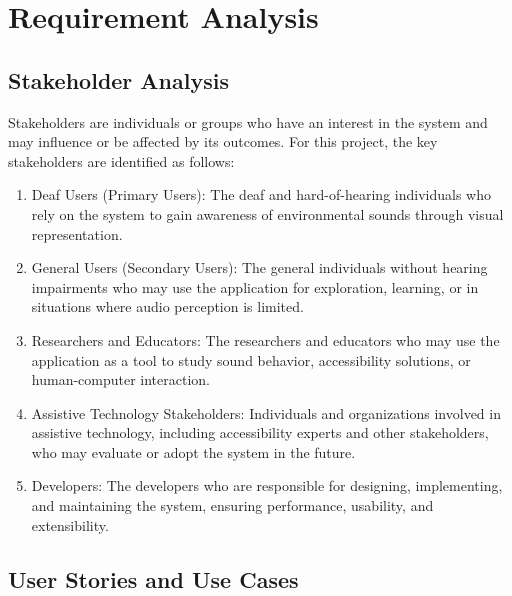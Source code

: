 \chapter{Requirement Analysis}
\label{chap:requirement-analysis}

\section{Stakeholder Analysis}
\label{section:stakeholder-analysis}

Stakeholders are individuals or groups who have an interest in the system and may influence or be affected by its outcomes. 
For this project, the key stakeholders are identified as follows:

\begin{enumerate}[leftmargin=80pt]
    \item Deaf Users (Primary Users): The deaf and hard-of-hearing individuals who rely on the system to gain awareness of environmental sounds through visual representation.
    \item General Users (Secondary Users): The general individuals without hearing impairments who may use the application for exploration, learning, or in situations where audio perception is limited.
    \item Researchers and Educators: The researchers and educators who may use the application as a tool to study sound behavior, accessibility solutions, or human-computer interaction.
    \item Assistive Technology Stakeholders: Individuals and organizations involved in assistive technology, including accessibility experts and other stakeholders, who may evaluate or adopt the system in the future.
    \item Developers: The developers who are responsible for designing, implementing, and maintaining the system, ensuring performance, usability, and extensibility.
\end{enumerate}

\section{User Stories and Use Cases}
\label{section:user-stories-use-cases}


